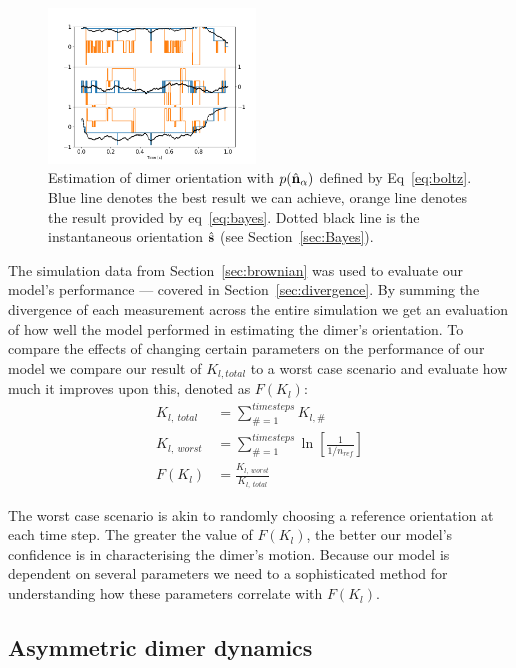 \documentclass[12pt]{spieman}
\begin{document}
\begin{spacing}{1.5}
\begin{figure}[h]
\centering
\includegraphics[width=5.5cm]{./Images/fig8a.png}
\caption{\label{fig:biased}
%
Estimation of dimer orientation with $p(\hat{\bf n}_\alpha)$ defined
by Eq~\eqref{eq:boltz}.  Blue line denotes the best result we can
achieve, orange line denotes the result provided by eq~\ref{eq:bayes}.
Dotted black line is the instantaneous orientation $\hat{\bf s}$ (see Section~\ref{sec:Bayes}).
}
\end{figure} 

The simulation data from Section~\ref{sec:brownian} was used to evaluate our model's performance --- covered in Section~\ref{sec:divergence}. By summing the divergence of each measurement across the entire simulation we get an evaluation of how well the model performed in estimating the dimer's orientation. To compare the effects of changing certain parameters on the performance of our model we compare our result of $K_{l,total}$ to a worst case scenario and evaluate how much it improves upon this, denoted as $F(K_l)$:
\begin{align}
  K_{l, \ total} &= \sum\limits_{\# =1}^{timesteps} K_{l,\#}
  \\
  K_{l, \ worst} &= \sum\limits_{\#=1}^{timesteps} \ln \left[\frac{1}{1/n_{ref}} \right]
  \\
  F(K_l) &= \frac{K_{l,\ worst}}{K_{l, \ total}}
\end{align}

The worst case scenario is akin to randomly choosing a reference
orientation at each time step. The greater the value of $F(K_l)$, the
better our model's confidence is in characterising the dimer's
motion. Because our model is dependent on several parameters we need
to a sophisticated method for understanding how these parameters
correlate with $F(K_l)$.

\subsection{Asymmetric dimer dynamics}
\label{sec:motion}


\end{spacing}
\end{document}
